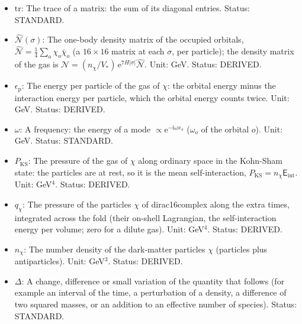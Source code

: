 \documentclass[
  10pt,
]{article}
\begin{document}
\begin{itemize}
  \(\hat\rho(\sigma)\): The scalar density of the occupied orbitals,
  \(\hat\rho = \frac14\sum_o\bar\chi_o\chi_o\) (per particle); the
  scalar density of the gas is
  \(n_{\mathrm{s}} = (n_\chi/V_*)\,\mathrm{e}^{7H\lvert\sigma\rvert}\hat\rho\).
  Unit: GeV. Status: DERIVED.
\item
  \(\mathrm{tr}\): The trace of a matrix: the sum of its diagonal
  entries. Status: STANDARD.
\item
  \(\hat{\mathcal{N}}(\sigma)\): The one-body density matrix of the
  occupied orbitals,
  \(\hat{\mathcal{N}} = \frac14\sum_o\chi_o\bar\chi_o\) (a
  \(16 \times 16\) matrix at each \(\sigma\), per particle); the density
  matrix of the gas is
  \(\mathcal{N} = (n_\chi/V_*)\,\mathrm{e}^{7H\lvert\sigma\rvert}\hat{\mathcal{N}}\).
  Unit: GeV. Status: DERIVED.
\item
  \(\epsilon_{\mathrm{p}}\): The energy per particle of the gas of
  \(\chi\): the orbital energy minus the interaction energy per
  particle, which the orbital energy counts twice. Unit: GeV. Status:
  DERIVED.
\item
  \(\omega\): A frequency: the energy of a mode
  \(\propto \mathrm{e}^{-\mathrm{i}\omega x_4}\) (\(\omega_o\) of the
  orbital \(o\)). Unit: GeV. Status: STANDARD.
\item
  \(P_{\mathrm{KS}}\): The pressure of the gas of \(\chi\) along
  ordinary space in the Kohn-Sham state: the particles are at rest, so
  it is the mean self-interaction,
  \(P_{\mathrm{KS}} = n_\chi\mathsf{E}_{\mathrm{int}}\). Unit:
  GeV\(^4\). Status: DERIVED.
\item
  \(q_\chi\): The pressure of the particles \(\chi\) of dirac16complex
  along the extra times, integrated across the fold (their on-shell
  Lagrangian, the self-interaction energy per volume; zero for a dilute
  gas). Unit: GeV\(^4\). Status: DERIVED.
\item
  \(n_\chi\): The number density of the dark-matter particles \(\chi\)
  (particles plus antiparticles). Unit: GeV\(^3\). Status: DERIVED.
\item
  \(\Delta\): A change, difference or small variation of the quantity
  that follows (for example an interval of the time, a perturbation of a
  density, a difference of two squared masses, or an addition to an
  effective number of species). Status: STANDARD.
\end{itemize}
\end{document}
